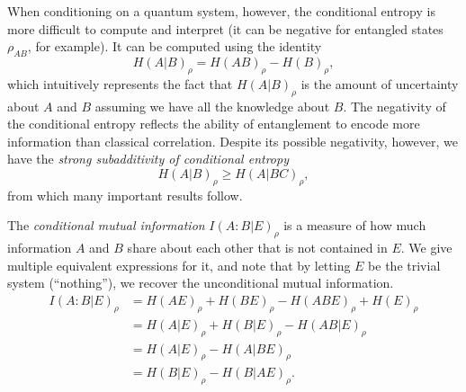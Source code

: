 \documentclass[10pt, a4paper]{article}
\numberwithin{equation}{section} %
\theoremstyle{definition}
\theoremstyle{plain}
\newcommand{\?}{\mathrel{?}} %
\begin{document}
\begin{appendices}
                          When conditioning on a quantum system, however, the conditional entropy is more difficult to compute and interpret (it can be negative for entangled states \(\rho_{AB}\), for example). It can be computed using the identity
                          \begin{equation}
                            H{(A|B)}_{\rho} = H{(AB)}_{\rho} - H{(B)}_{\rho},
                          \end{equation}
                          which intuitively represents the fact that \(H{(A|B)}_{\rho}\) is the amount of uncertainty about \(A\) and \(B\) assuming we have all the knowledge about \(B\). The negativity of the conditional entropy reflects the ability of entanglement to encode more information than classical correlation. Despite its possible negativity, however, we have the \emph{strong subadditivity of conditional entropy}
                          \begin{equation}
                            H{(A|B)}_{\rho} \geq H{(A|BC)}_{\rho},
                          \end{equation}
                          from which many important results follow.

                          The \emph{conditional mutual information} \(I{(A:B|E)}_{\rho}\) is a measure of how much information \(A\) and \(B\) share about each other that is not contained in \(E\). We give multiple equivalent expressions for it, and note that by letting \(E\) be the trivial system (``nothing''), we recover the unconditional mutual information.
                          \begin{align}
                            I{(A:B|E)}_{\rho} &= H{(AE)}_{\rho} + H{(BE)}_{\rho} - H{(ABE)}_{\rho} + H{(E)}_{\rho} \\
                                              &= H{(A|E)}_{\rho} + H{(B|E)}_{\rho} - H{(AB|E)}_{\rho} \\
                                              &= H{(A|E)}_{\rho} - H{(A|BE)}_{\rho} \\
                                              &= H{(B|E)}_{\rho} - H{(B|AE)}_{\rho}.
                          \end{align}


\end{appendices}
\end{document}
